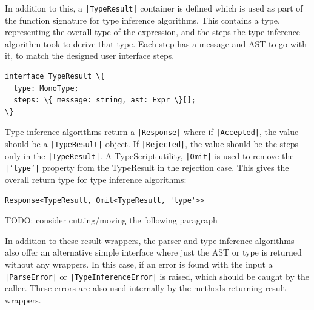 \documentclass[a4paper,fleqn,12pt]{article}
\begin{document}
In addition to this, a \texttt{|TypeResult|} container is defined which is used as part of the function signature for type inference algorithms. This contains a type, representing the overall type of the expression, and the steps the type inference algorithm took to derive that type. Each step has a message and AST to go with it, to match the designed user interface steps.

\begin{verbatim}
interface TypeResult \{
  type: MonoType;
  steps: \{ message: string, ast: Expr \}[];
\}
\end{verbatim}

Type inference algorithms return a \texttt{|Response|} where if \texttt{|Accepted|}, the value should be a \texttt{|TypeResult|} object. If \texttt{|Rejected|}, the value should be the steps only in the \texttt{|TypeResult|}. A TypeScript utility, \texttt{|Omit|} is used to remove the \texttt{|’type’|} property from the TypeResult in the rejection case. This gives the overall return type for type inference algorithms:

\begin{verbatim}
Response<TypeResult, Omit<TypeResult, 'type'>>
\end{verbatim}

TODO: consider cutting/moving the following paragraph

In addition to these result wrappers, the parser and type inference algorithms also offer an alternative simple interface where just the AST or type is returned without any wrappers. In this case, if an error is found with the input a \texttt{|ParseError|} or \texttt{|TypeInferenceError|} is raised, which should be caught by the caller. These errors are also used internally by the methods returning result wrappers.
\end{document}
